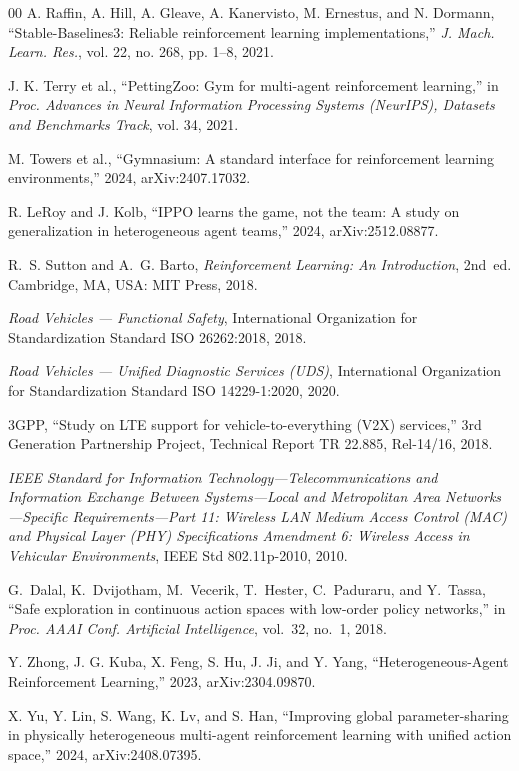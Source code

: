 \documentclass[conference]{IEEEtran}
\begin{document}
\begin{thebibliography}{00}
A. Raffin, A. Hill, A. Gleave, A. Kanervisto, M. Ernestus, and N. Dormann,
``Stable-Baselines3: Reliable reinforcement learning implementations,''
\textit{J. Mach. Learn. Res.}, vol. 22, no. 268, pp. 1--8, 2021.

J. K. Terry et al., ``PettingZoo: Gym for multi-agent reinforcement learning,''
in \textit{Proc. Advances in Neural Information Processing Systems (NeurIPS),
Datasets and Benchmarks Track}, vol. 34, 2021.

M. Towers et al., ``Gymnasium: A standard interface for reinforcement learning
environments,'' 2024, arXiv:2407.17032.

R. LeRoy and J. Kolb, ``IPPO learns the game, not the team: A study on
generalization in heterogeneous agent teams,'' 2024, arXiv:2512.08877.

R.~S. Sutton and A.~G. Barto, \textit{Reinforcement Learning: An Introduction},
2nd~ed. Cambridge, MA, USA: MIT Press, 2018.

\textit{Road Vehicles --- Functional Safety}, International Organization for
Standardization Standard ISO 26262:2018, 2018.

\textit{Road Vehicles --- Unified Diagnostic Services (UDS)}, International
Organization for Standardization Standard ISO 14229-1:2020, 2020.

3GPP, ``Study on LTE support for vehicle-to-everything (V2X) services,''
3rd Generation Partnership Project, Technical Report TR 22.885, Rel-14/16, 2018.

\textit{IEEE Standard for Information Technology---Telecommunications and
Information Exchange Between Systems---Local and Metropolitan Area
Networks---Specific Requirements---Part 11: Wireless LAN Medium Access Control
(MAC) and Physical Layer (PHY) Specifications Amendment 6: Wireless Access
in Vehicular Environments}, IEEE Std 802.11p-2010, 2010.

G.~Dalal, K.~Dvijotham, M.~Vecerik, T.~Hester, C.~Paduraru, and Y.~Tassa,
``Safe exploration in continuous action spaces with low-order policy networks,''
in \textit{Proc. AAAI Conf. Artificial Intelligence}, vol.~32, no.~1, 2018.


Y. Zhong, J. G. Kuba, X. Feng, S. Hu, J. Ji, and Y. Yang,
``Heterogeneous-Agent Reinforcement Learning,'' 2023, arXiv:2304.09870.

X. Yu, Y. Lin, S. Wang, K. Lv, and S. Han,
``Improving global parameter-sharing in physically heterogeneous multi-agent
reinforcement learning with unified action space,'' 2024, arXiv:2408.07395.


\end{thebibliography}
\end{document}
